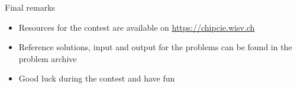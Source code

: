 \documentclass[11pt,pdf, aspectratio=169]{beamer}
\begin{document}
  \begin{frame}{Final remarks}
    \begin{itemize}
      \item Resources for the contest are available on \url{https://chipcie.wisv.ch}
      \item Reference solutions, input and output for the problems can be found in the problem archive
      \item Good luck during the contest and have fun
    \end{itemize}
  \end{frame}
\end{document}
